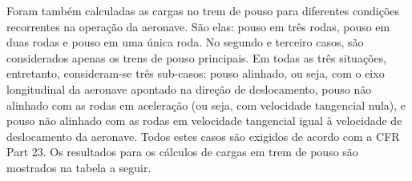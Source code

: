 Foram também calculadas as cargas no trem de pouso para diferentes condições recorrentes na operação da aeronave. São elas: pouso em três rodas, pouso em duas rodas e pouso em uma única roda. No segundo e terceiro casos, são considerados apenas os trens de pouso principais. Em todas as três situações, entretanto, consideram-se três sub-casos: pouso alinhado, ou seja, com o eixo longitudinal da aeronave apontado na direção de deslocamento, pouso não alinhado com as rodas em aceleração (ou seja, com velocidade tangencial nula), e pouso não alinhado com as rodas em velocidade tangencial igual à velocidade de deslocamento da aeronave. Todos estes casos são exigidos de acordo com a CFR Part 23.
Os resultados para os cálculos de cargas em trem de pouso são mostrados na tabela a seguir.
